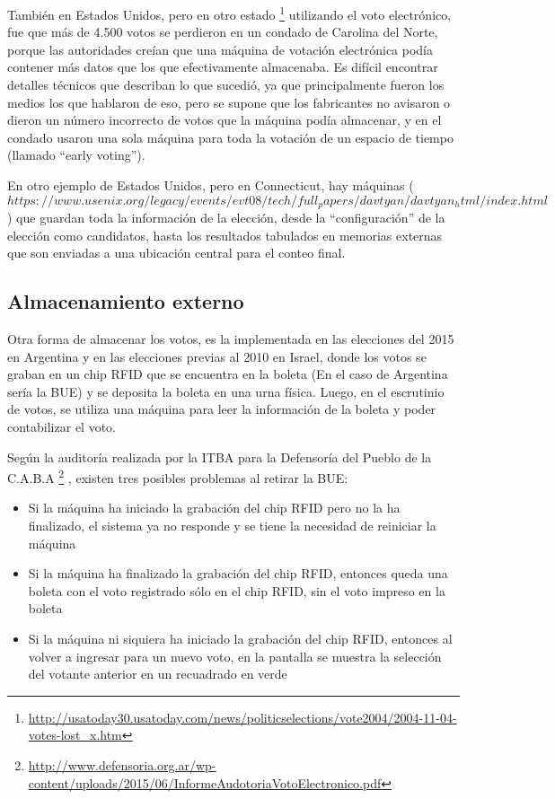 También en Estados Unidos, pero en otro estado
\footnote{\url{http://usatoday30.usatoday.com/news/politicselections/vote2004/2004-11-04-votes-lost_x.htm}}
 utilizando el voto electrónico, fue que más de 4.500 votos se perdieron en un condado de Carolina del Norte, porque las autoridades creían que una máquina de votación electrónica podía contener más datos que los que efectivamente almacenaba. Es difícil encontrar detalles técnicos que describan lo que sucedió, ya que principalmente fueron los medios los que hablaron de eso, pero se supone que los fabricantes no avisaron o dieron un número incorrecto de votos que la máquina podía almacenar, y en el condado usaron una sola máquina para toda la votación de un espacio de tiempo (llamado ``early voting'').

En otro ejemplo de Estados Unidos, pero en Connecticut, hay máquinas ($https://www.usenix.org/legacy/events/evt08/tech/full_papers/davtyan/davtyan_html/index.html$) que guardan toda la información de la elección, desde la ``configuración'' de la elección como candidatos, hasta los resultados tabulados en memorias externas que son enviadas a una ubicación central para el conteo final.

\subsection{Almacenamiento externo}

Otra forma de almacenar los votos, es la implementada en las elecciones del 2015 en Argentina y en las elecciones previas al 2010 en Israel, donde los votos se graban en un chip RFID que se encuentra en la boleta (En el caso de Argentina sería la BUE) y se deposita la boleta en una urna física. Luego, en el escrutinio de votos, se utiliza una máquina para leer la información de la boleta y poder contabilizar el voto. 

Según la auditoría realizada por la ITBA para la Defensoría del Pueblo de la C.A.B.A
\footnote{\url{http://www.defensoria.org.ar/wp-content/uploads/2015/06/InformeAudotoriaVotoElectronico.pdf}}
, existen tres posibles problemas al retirar la BUE:
\begin{itemize}
	\item Si la máquina ha iniciado la grabación del chip RFID pero no la ha finalizado, el sistema ya no responde y se tiene la necesidad de reiniciar la máquina
	\item Si la máquina ha finalizado la grabación del chip RFID, entonces queda una boleta con el voto registrado sólo en el chip RFID, sin el voto impreso en la boleta
	\item Si la máquina ni siquiera ha iniciado la grabación del chip RFID, entonces al volver a ingresar para un nuevo voto, en la pantalla se muestra la selección del votante anterior en un recuadrado en verde
\end{itemize}


